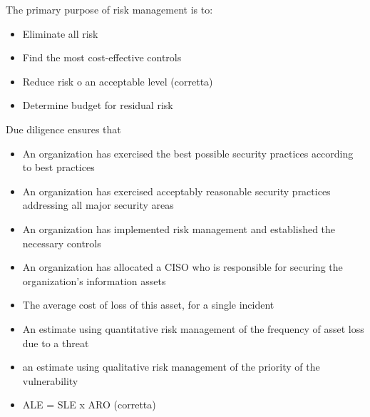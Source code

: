 The primary purpose of risk management is to:
\begin{itemize}
\item Eliminate all risk
\item Find the most cost-effective controls
\item Reduce risk o an acceptable level (corretta)
\item Determine budget for residual risk
\end{itemize}

Due diligence ensures that

\begin{itemize}
\item An organization has exercised the best possible security practices 
according to best practices
\item An organization has exercised acceptably reasonable security practices 
addressing all major security areas
\item An organization has implemented risk management and established the 
necessary controls
\item An organization has allocated a CISO who is responsible for securing the 
organization's information assets
\end{itemize}


\begin{itemize}
\item The average cost of loss of this asset, for a single incident
\item An estimate using quantitative risk management of the frequency of asset 
loss due to a threat
\item an estimate using qualitative risk management of the priority of the 
vulnerability
\item ALE = SLE x ARO (corretta)
\end{itemize}
